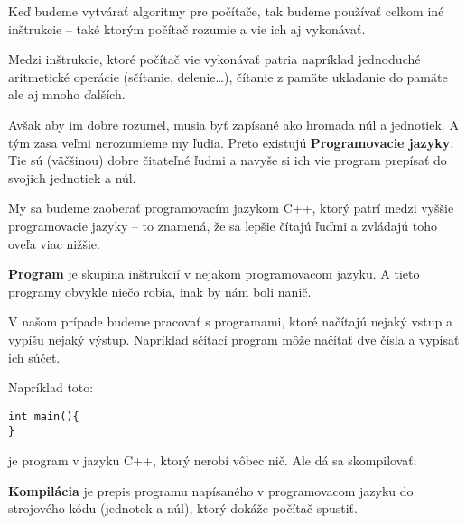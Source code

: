 Keď budeme vytvárať algoritmy pre počítače, tak budeme používať celkom iné inštrukcie -- také ktorým počítač rozumie a vie ich aj vykonávať.

Medzi inštrukcie, ktoré počítač vie vykonávať patria napríklad jednoduché aritmetické operácie (sčítanie, delenie\dots), 
čítanie z pamäte ukladanie do pamäte ale aj mnoho ďalších. 

Avšak aby im dobre rozumel, musia byť zapísané ako hromada núl a jednotiek. A tým zasa veľmi nerozumieme my ľudia.
Preto existujú \textbf{Programovacie jazyky}. Tie sú (väčšinou) dobre čitateľné ľudmi a navyše si ich vie program prepísať
do svojich jednotiek a núl.

My sa budeme zaoberať programovacím jazykom C++, ktorý patrí medzi vyššie programovacie jazyky -- to znamená, že sa
lepšie čítajú ľuďmi a zvládajú toho oveľa viac nižšie.

\medskip

\textbf{Program} je skupina inštrukcií v nejakom programovacom jazyku.
A tieto programy obvykle niečo robia, inak by nám boli nanič. 

V našom prípade budeme pracovať s programami, ktoré načítajú nejaký vstup a vypíšu nejaký výstup.
Napríklad sčítací program môže načítať dve čísla a vypísať ich súčet.

Napríklad toto: \begin{lstlisting}
int main(){
}
\end{lstlisting}
je program v jazyku C++, ktorý nerobí vôbec nič. Ale dá sa skompilovať. 


\textbf{Kompilácia} je prepis programu napísaného v programovacom jazyku do strojového kódu (jednotek a núl),
ktorý dokáže počítač spustiť.

